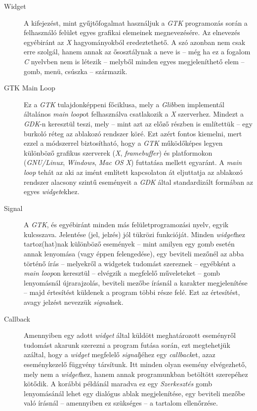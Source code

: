 \documentclass[a4paper,10pt]{article}
\begin{document}
\begin{description}
 \item[Widget] A kifejezést, mint gyűjtőfogalmat használjuk a \textit{GTK} programozás során a felhasználó felület egyes grafikai elemeinek megnevezésére. Az elnevezés egyébiránt az \textit{X} hagyományokból eredeztethető. A szó azonban nem csak erre szolgál, hanem annak az ősosztálynak a neve is -- még ha ez a fogalom \textit{C} nyelvben nem is létezik -- melyből minden egyes megjeleníthető elem -- gomb, menü, csúszka -- származik.

 \item[GTK Main Loop] Ez a \textit{GTK} tulajdonképpeni főciklusa, mely a \textit{Glib}ben implementál általános \textit{main loop}ot felhasználva csatlakozik a \textit{X} szerverhez. Mindezt a \textit{GDK}-n keresztül teszi, mely -- mint azt az előző részben is említettük -- egy burkoló réteg az ablakozó rendszer köré. Ezt azért fontos kiemelni, mert ezzel a módszerrel biztosítható, hogy a \textit{GTK} működőképes legyen különböző grafikus szerverek (\textit{X}, \textit{framebuffer}) és platformokon (\textit{GNU/Linux}, \textit{Windows}, \textit{Mac OS X}) futtatása mellett egyaránt. A \textit{main loop} tehát az aki az imént említett kapcsolaton át eljuttatja az ablakozó rendszer alacsony szintű eseményeit a \textit{GDK} által standardizált formában az egyes \textit{widget}ekhez.

 \item[Signal] A \textit{GTK}, és egyébiránt minden más felületprogramozási nyelv, egyik kulcsszava. Jelentése (jel, jelzés) jól tükrözi funkcióját. Minden \textit{widget}hez tartoz(hat)nak különböző események -- mint amilyen egy gomb esetén annak lenyomása (vagy éppen felengedése), egy beviteli mezőnél az abba történő írás -- melyekről a widgetek tudomást szereznek -- egyébként a \textit{main loop}on keresztül -- elvégzik a megfelelő műveleteket -- gomb lenyomásnál újrarajzolás, beviteli mezőbe írásnál a karakter megjelenítése -- majd értesítést küldenek a program többi része felé. Ezt az értesítést, avagy jelzést nevezzük \textit{signal}nek.

 \item[Callback] Amennyiben egy adott \textit{widget} által küldött meghatározott eseményről tudomást akarunk szerezni a program futása során, ezt megtehetjük azáltal, hogy a \textit{widget} megfelelő \textit{signal}jéhez egy \textit{callback}et, azaz eseménykezelő függvény társítunk. Itt minden olyan esemény elvégezhető, mely nem a \textit{widget}hez, hanem annak programunkban betöltött szerepéhez kötődik. A korábbi példánál maradva ez egy \textit{Szerkesztés} gomb lenyomásánál lehet egy dialógus ablak megjelenítése, egy beviteli mezőbe való írásnál -- amennyiben ez szükséges -- a tartalom ellenőrzése.
\end{description}
\end{document}
